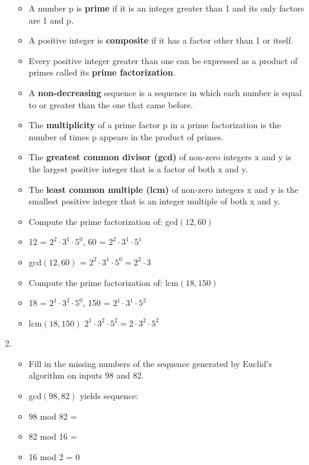 \documentclass[12pt,a4paper]{article}
\begin{document}
\begin{enumerate}
  \begin{itemize}
    \item A number p is \textbf{prime} if it is an integer greater than 1 and its only factors are 1 and p.
    \item A positive integer is \textbf{composite} if it has a factor other than 1 or itself.
    \item Every positive integer greater than one can be expressed as a product of primes called its \textbf{prime factorization}.
    \item A \textbf{non-decreasing} sequence is a sequence in which each number is equal to or greater than the one that came before.
    \item The \textbf{multiplicity} of a prime factor p in a prime factorization is the number of times p appears in the product of primes.
    \item The \textbf{greatest common divisor (gcd)} of non-zero integers x and y is the largest positive integer that is a factor of both x and y.
    \item The \textbf{least common multiple (lcm)} of non-zero integers x and y is the smallest positive integer that is an integer multiple of both x and y.
    \item Compute the prime factorization of: gcd\((12, 60)\)
    \item[] 12	=	\(2^2 \cdot 3^1 \cdot 5^0\), 60 = \(2^2 \cdot 3^1 \cdot 5^1\)
    \item[] gcd\((12,60)\) = \(2^2 \cdot 3^1 \cdot 5^0 = \boxed{2^2 \cdot 3}\) 
    \item Compute the prime factorization of: lcm\((18, 150)\)
    \item[] 18 = \(2^1 \cdot 3^2 \cdot 5^0\), 150 = \(2^1 \cdot 3^1 \cdot 5^2\)
    \item[] lcm\((18,150)\)  \(2^1 \cdot 3^2 \cdot 5^2 = \boxed{2 \cdot 3^2 \cdot 5^2}\)
  \end{itemize}
  \item {}
  \begin{itemize}
    \item Fill in the missing numbers of the sequence generated by Euclid's algorithm on inputs 98 and 82.
    \item[] gcd\((98, 82)\) yields sequence:
    \item[] 98 mod 82 = 
    \item[] 82 mod 16 = 
    \item[] 16 mod 2 = 0   

\end{itemize}
\end{enumerate}
\end{document}
